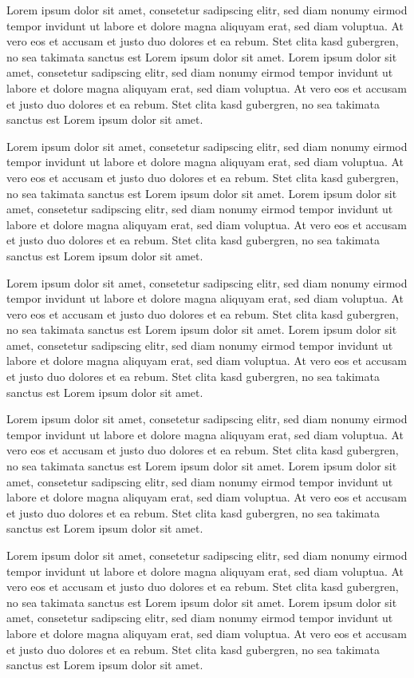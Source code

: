 \documentclass[11pt,a4paper,twoside,openright]{report}
\begin{document}
Lorem ipsum dolor sit amet, consetetur sadipscing elitr, sed diam nonumy
eirmod tempor invidunt ut labore et dolore magna aliquyam erat, sed diam voluptua. At
vero eos et accusam et justo duo dolores et ea rebum. Stet clita kasd gubergren, no sea
takimata sanctus est Lorem ipsum dolor sit amet. Lorem ipsum dolor sit amet, consetetur
sadipscing elitr, sed diam nonumy eirmod tempor invidunt ut labore et dolore magna
aliquyam erat, sed diam voluptua. At vero eos et accusam et justo duo dolores et ea
rebum. Stet clita kasd gubergren, no sea takimata sanctus est Lorem ipsum dolor sit amet.

Lorem ipsum dolor sit amet, consetetur sadipscing elitr, sed diam nonumy
eirmod tempor invidunt ut labore et dolore magna aliquyam erat, sed diam voluptua. At
vero eos et accusam et justo duo dolores et ea rebum. Stet clita kasd gubergren, no sea
takimata sanctus est Lorem ipsum dolor sit amet. Lorem ipsum dolor sit amet, consetetur
sadipscing elitr, sed diam nonumy eirmod tempor invidunt ut labore et dolore magna
aliquyam erat, sed diam voluptua. At vero eos et accusam et justo duo dolores et ea
rebum. Stet clita kasd gubergren, no sea takimata sanctus est Lorem ipsum dolor sit amet.

Lorem ipsum dolor sit amet, consetetur sadipscing elitr, sed diam nonumy
eirmod tempor invidunt ut labore et dolore magna aliquyam erat, sed diam voluptua. At
vero eos et accusam et justo duo dolores et ea rebum. Stet clita kasd gubergren, no sea
takimata sanctus est Lorem ipsum dolor sit amet. Lorem ipsum dolor sit amet, consetetur
sadipscing elitr, sed diam nonumy eirmod tempor invidunt ut labore et dolore magna
aliquyam erat, sed diam voluptua. At vero eos et accusam et justo duo dolores et ea
rebum. Stet clita kasd gubergren, no sea takimata sanctus est Lorem ipsum dolor sit amet.

Lorem ipsum dolor sit amet, consetetur sadipscing elitr, sed diam nonumy
eirmod tempor invidunt ut labore et dolore magna aliquyam erat, sed diam voluptua. At
vero eos et accusam et justo duo dolores et ea rebum. Stet clita kasd gubergren, no sea
takimata sanctus est Lorem ipsum dolor sit amet. Lorem ipsum dolor sit amet, consetetur
sadipscing elitr, sed diam nonumy eirmod tempor invidunt ut labore et dolore magna
aliquyam erat, sed diam voluptua. At vero eos et accusam et justo duo dolores et ea
rebum. Stet clita kasd gubergren, no sea takimata sanctus est Lorem ipsum dolor sit amet.

Lorem ipsum dolor sit amet, consetetur sadipscing elitr, sed diam nonumy
eirmod tempor invidunt ut labore et dolore magna aliquyam erat, sed diam voluptua. At
vero eos et accusam et justo duo dolores et ea rebum. Stet clita kasd gubergren, no sea
takimata sanctus est Lorem ipsum dolor sit amet. Lorem ipsum dolor sit amet, consetetur
sadipscing elitr, sed diam nonumy eirmod tempor invidunt ut labore et dolore magna
aliquyam erat, sed diam voluptua. At vero eos et accusam et justo duo dolores et ea
rebum. Stet clita kasd gubergren, no sea takimata sanctus est Lorem ipsum dolor sit amet.
\end{document}
